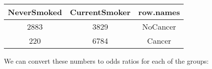 \documentclass[]{book}
\newenvironment{Shaded}{\begin{snugshade}}{\end{snugshade}}
\newcommand{\KeywordTok}[1]{\textcolor[rgb]{0.13,0.29,0.53}{\textbf{#1}}}
\newcommand{\DataTypeTok}[1]{\textcolor[rgb]{0.13,0.29,0.53}{#1}}
\newcommand{\DecValTok}[1]{\textcolor[rgb]{0.00,0.00,0.81}{#1}}
\newcommand{\StringTok}[1]{\textcolor[rgb]{0.31,0.60,0.02}{#1}}
\newcommand{\CommentTok}[1]{\textcolor[rgb]{0.56,0.35,0.01}{\textit{#1}}}
\newcommand{\OperatorTok}[1]{\textcolor[rgb]{0.81,0.36,0.00}{\textbf{#1}}}
\newcommand{\NormalTok}[1]{#1}
\theoremstyle{definition}
\theoremstyle{definition}
\theoremstyle{definition}
\theoremstyle{remark}
\begin{document}
\begin{longtable}[]{@{}ccc@{}}
\toprule
\begin{minipage}[b]{0.18\columnwidth}\centering\strut
NeverSmoked\strut
\end{minipage} & \begin{minipage}[b]{0.20\columnwidth}\centering\strut
CurrentSmoker\strut
\end{minipage} & \begin{minipage}[b]{0.14\columnwidth}\centering\strut
row.names\strut
\end{minipage}\tabularnewline
\midrule
\endhead
\begin{minipage}[t]{0.18\columnwidth}\centering\strut
2883\strut
\end{minipage} & \begin{minipage}[t]{0.20\columnwidth}\centering\strut
3829\strut
\end{minipage} & \begin{minipage}[t]{0.14\columnwidth}\centering\strut
NoCancer\strut
\end{minipage}\tabularnewline
\begin{minipage}[t]{0.18\columnwidth}\centering\strut
220\strut
\end{minipage} & \begin{minipage}[t]{0.20\columnwidth}\centering\strut
6784\strut
\end{minipage} & \begin{minipage}[t]{0.14\columnwidth}\centering\strut
Cancer\strut
\end{minipage}\tabularnewline
\bottomrule
\end{longtable}

We can convert these numbers to odds ratios for each of the groups:

\begin{Shaded}
\end{Shaded}
\end{document}
